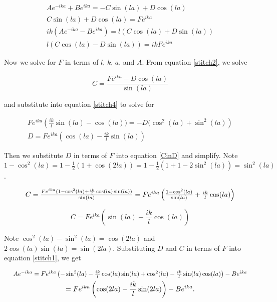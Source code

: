 \documentclass[letterpaper,12pt]{article}
\begin{document}
    \begin{gather}
        Ae^{-ika} + Be^{ika} = -C\sin(la) + D\cos(la) \label{stitch1} \\
        C\sin(la) + D\cos(la) = Fe^{ika} \label{stitch2} \\
        ik(Ae^{-ika} - Be^{ika}) = l(C\cos(la) + D\sin(la)) \label{stitch3} \\
        l(C\cos(la) - D\sin(la)) = ikFe^{ika} \label{stitch4}
    \end{gather}

    Now we solve for $F$ in terms of $l$, $k$, $a$, and $A$. From
    equation \eqref{stitch2}, we solve

    \begin{equation}
        C = \frac{Fe^{ika} - D\cos(la)}{\sin(la)} \label{CinD}
    \end{equation}

    and substitute into equation \eqref{stitch4} to solve for

    \begin{gather*}
        Fe^{ika}
        \left(
        \frac{ik}{l}\sin(la) - \cos(la)) = -D(\cos^2(la) + \sin^2(la)
        \right)
        \\
        D = Fe^{ika}
        \left(
        \cos(la) - \frac{ik}{l}\sin(la)
        \right)
    \end{gather*}

    Then we substitute $D$ in terms of $F$ into equation \eqref{CinD} and
    simplify. Note $1 - \cos^2(la) = 1 - \frac{1}{2}(1 + \cos(2la)) = 1 -
    \frac{1}{2}(1 + 1 - 2\sin^2(la)) = \sin^2(la)$.

    \[
        \scalebox{1}{$
        C
        = \frac{Fe^{ika}(1 - \cos^2(la) +
        \frac{ik}{l}\cos(la)\sin(la))}{\sin(la)}
        = Fe^{ika}
        \left(
        \frac{1 - \cos^2(la)}{\sin(la)} + \frac{ik}{l}\cos(la)
        \right)
        $}
    \]

    \[
        C = Fe^{ika}
        \left(
        \sin(la) + \frac{ik}{l}\cos(la)
        \right)
    \]

    Note $\cos^2(la) - \sin^2(la) = \cos(2la)$ and $2\cos(la)\sin(la) =
    \sin(2la)$. Substituting $D$ and $C$ in terms of $F$ into equation
    \eqref{stitch1}, we get

    \begin{gather}
        \scalebox{0.9}{$
        Ae^{-ika}
        = Fe^{ika}
        \left(
        -\sin^2(la) - \frac{ik}{l}\cos(la)\sin(la) + \cos^2(la)
        - \frac{ik}{l}\sin(la)\cos(la)
        \right)
        - Be^{ika}
        \nonumber
        $}
        \\
        = Fe^{ika}
        \left(
        \cos(2la) - \frac{ik}{l}\sin(2la)
        \right)
        - Be^{ika}. \label{AinFB}
    \end{gather}
\end{document}
